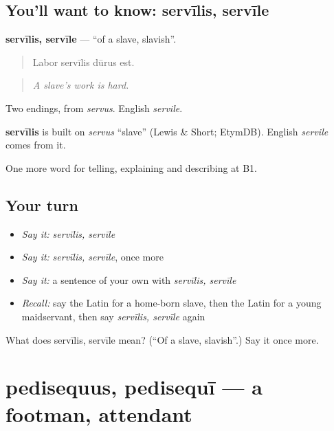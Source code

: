 \subsection*{You'll want to know: servīlis, servīle}
\textbf{servīlis, servīle} — \textquotedblleft{}of a slave, slavish\textquotedblright{}.

\begin{quote}
Labor servīlis dūrus est.
\end{quote}

\begin{quote}
\emph{A slave's work is hard.}
\end{quote}

Two endings, from \emph{servus}. English \emph{servile}.

\begin{cousinweb}
\textbf{servīlis} is built on \emph{servus} \textquotedblleft{}slave\textquotedblright{} (Lewis \& Short; EtymDB). English \emph{servile} comes from it.
\end{cousinweb}

\begin{grammarlens}[title={What you've built}]
One more word for telling, explaining and describing at B1.
\end{grammarlens}

\subsection*{Your turn}
\begin{itemize}
\raggedright
  \item \emph{Say it:} \emph{servīlis, servīle}
  \item \emph{Say it:} \emph{servīlis, servīle}, once more
  \item \emph{Say it:} a sentence of your own with \emph{servīlis, servīle}
  \item \emph{Recall:} say the Latin for a home-born slave, then the Latin for a young maidservant, then say \emph{servīlis, servīle} again
\end{itemize}

\begin{tcolorbox}[breakable,colback=teal!4,colframe=teal!35!black,title={Before you move on}]
What does servīlis, servīle mean? (\textquotedblleft{}Of a slave, slavish\textquotedblright{}.) Say it once more.
\end{tcolorbox}
\section[pedisequus, pedisequī]{pedisequus, pedisequī — a footman, attendant}

